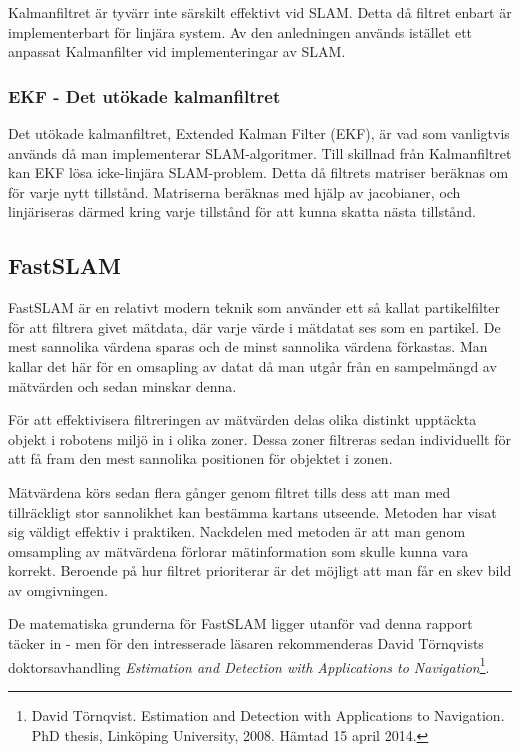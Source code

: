 \documentclass[a4paper,12pt,fleqn]{article}
\begin{document}
Kalmanfiltret är tyvärr inte särskilt effektivt vid SLAM. Detta då filtret enbart är implementerbart för linjära system. Av den anledningen används istället ett anpassat Kalmanfilter vid implementeringar av SLAM.  

\subsubsection{EKF - Det utökade kalmanfiltret}

Det utökade kalmanfiltret, Extended Kalman Filter (EKF), är vad som vanligtvis används då man implementerar SLAM-algoritmer. Till skillnad från Kalmanfiltret kan EKF lösa icke-linjära SLAM-problem. Detta då filtrets matriser beräknas om för varje nytt tillstånd. Matriserna beräknas med hjälp av jacobianer, och linjäriseras därmed kring varje tillstånd för att kunna skatta nästa tillstånd. 

\subsection{FastSLAM}
FastSLAM är en relativt modern teknik som använder ett så kallat partikelfilter för att filtrera givet mätdata, där varje värde i mätdatat ses som en partikel. De mest sannolika värdena sparas och de minst sannolika värdena förkastas. Man kallar det här för en omsapling av datat då man utgår från en sampelmängd av mätvärden och sedan minskar denna. 

För att effektivisera filtreringen av mätvärden delas olika distinkt upptäckta objekt i robotens miljö in i olika zoner. Dessa zoner filtreras sedan individuellt för att få fram den mest sannolika positionen för objektet i zonen. 

Mätvärdena körs sedan flera gånger genom filtret tills dess att man med tillräckligt stor sannolikhet kan bestämma kartans utseende. Metoden har visat sig väldigt effektiv i praktiken. Nackdelen med metoden är att man genom omsampling av mätvärdena förlorar mätinformation som skulle kunna vara korrekt. Beroende på hur filtret prioriterar är det möjligt att man får en skev bild av omgivningen.

De matematiska grunderna för FastSLAM ligger utanför vad denna rapport täcker in - men för den intresserade läsaren rekommenderas David Törnqvists doktorsavhandling \textit{Estimation and Detection with Applications to Navigation}\footnote{David Törnqvist. Estimation and Detection with Applications to Navigation. PhD thesis, Linköping University, 2008. Hämtad 15 april 2014.}.
\end{document}

